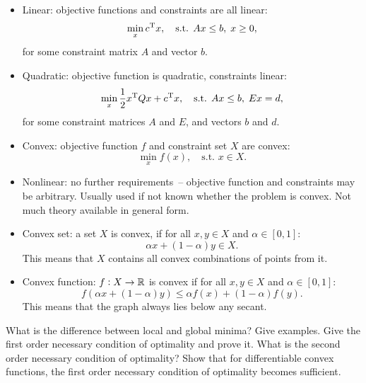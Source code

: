 \documentclass{article}
\begin{document}
\begin{itemize}
\item Linear: objective functions and constraints are all linear:
  \begin{equation*}
    \min_x c^{\mathrm{T}} x, \quad\text{s.t. } Ax \leq b,\; x \geq 0,
  \end{equation*}
  for some constraint matrix \(A\) and vector \(b\).
\item Quadratic: objective function is quadratic, constraints linear:
  \begin{equation*}
    \min_x \frac{1}{2}x^{\mathrm{T}} Q x + c^{\mathrm{T}} x, \quad\text{s.t. } Ax \leq b, \; Ex = d,
  \end{equation*}
  for some constraint matrices \(A\) and \(E\), and vectors \(b\) and \(d\).
\item Convex: objective function \(f\) and constraint set \(X\) are convex:
  \begin{equation*}
    \min_x f(x), \quad\text{s.t. } x \in X.
  \end{equation*}
\item Nonlinear: no further requirements~-- objective function and constraints may be
  arbitrary.  Usually used if not known whether the problem is convex.  Not much theory available in
  general form.
\item Convex set: a set \(X\) is convex, if for all \(x, y \in X\) and
  \(\alpha \in [0,1]\):
  \begin{equation*}
    \alpha x + (1 - \alpha) y \in X.
  \end{equation*}
  This means that \(X\) contains all convex combinations of points from it.
\item Convex function: \(f: X \to \mathbb{R}\) is convex if for all \(x, y \in X\) and
  \(\alpha \in [0,1]\):
  \begin{equation*}
    f(\alpha x + (1 - \alpha) y) \leq \alpha f(x) + (1 - \alpha) f(y).
  \end{equation*}
  This means that the graph always lies below any secant.
\end{itemize}

\begin{question}
  What is the difference between local and global minima?  Give examples.  Give the first order
  necessary condition of optimality and prove it. What is the second order necessary condition of
  optimality? Show that for differentiable convex functions, the first order necessary condition of
  optimality becomes sufficient.
\end{question}
\end{document}
